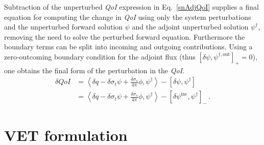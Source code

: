 \documentclass[12pt]{report}
\newcommand{\bra}{\left\langle}
\newcommand{\ket}{\right\rangle}
\newcommand{\sbra}{\left[}
\newcommand{\sket}{\right]}
\newcommand{\sigt}{\sigma_t}
\newcommand{\sigs}{\sigma_s}
\newcommand{\scalSource}{q}
\newcommand{\qoi}{{\it QoI}\xspace}
\begin{document}
Subtraction of the unperturbed \qoi expression in Eq.~\eqref{snAdjQoI} supplies a final equation for computing the change in \qoi using only the system perturbations and the unperturbed forward solution $\psi$ and the adjoint unperturbed
solution $\psi^\dag$, removing the need to solve the perturbed forward equation. 
Furthermore the boundary terms can be split into incoming and outgoing contributions.
Using a zero-outcoming  boundary condition for the adjoint flux
(thus $\sbra \delta \psi, \psi^{\dag,\text{out}} \sket_+=0$), one obtains the final 
form of the perturbation in the \qoi.
\begin{equation}
\label{snSens}
\begin{split}
\delta QoI &= \bra \delta \scalSource - \delta \sigt \psi + \frac{\delta\sigs}{4 \pi} \phi  , \psi^\dag  \ket - \sbra \delta \psi, \psi^\dag \sket \\
&= \bra \delta \scalSource - \delta \sigt \psi + \frac{\delta\sigs}{4 \pi} \phi , \psi^\dag  \ket - \sbra \delta \psi^{\text{inc}}, \psi^\dag \sket_- \,.
\end{split}
\end{equation}

\section{VET formulation}

\end{document}
